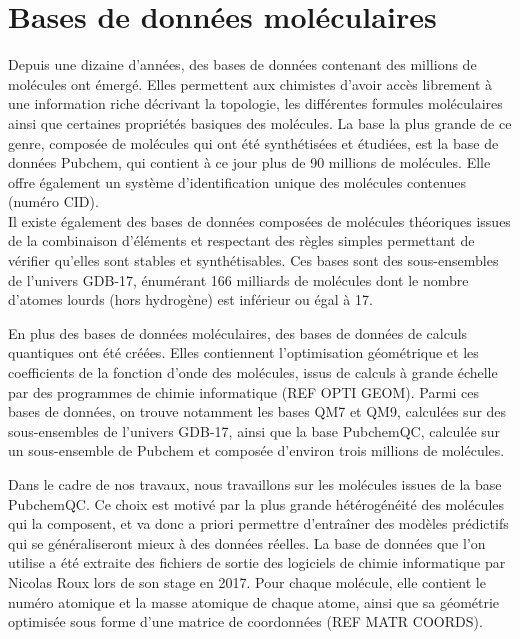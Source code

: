 \section{Bases de données moléculaires}
\par Depuis une dizaine d'années, des bases de données contenant des millions de molécules ont émergé. Elles permettent aux chimistes d'avoir accès librement à une information riche décrivant la topologie, les différentes formules moléculaires ainsi que certaines propriétés basiques des molécules. La base la plus grande de ce genre, composée de molécules qui ont été synthétisées et étudiées, est la base de données Pubchem\cite{pubchem}, qui contient à ce jour plus de 90 millions de molécules. Elle offre également un système d'identification unique des molécules contenues (numéro CID). \\
Il existe également des bases de données composées de molécules théoriques issues de la combinaison d'éléments et respectant des règles simples permettant de vérifier qu'elles sont stables et synthétisables. Ces bases sont des sous-ensembles de l'univers GDB-17\cite{gdb}, énumérant 166 milliards de molécules dont le nombre d'atomes lourds (hors hydrogène) est inférieur ou égal à 17.\\

\par En plus des bases de données moléculaires, des bases de données de calculs quantiques ont été créées. Elles contiennent l'optimisation géométrique et les coefficients de la fonction d'onde des molécules, issus de calculs à grande échelle par des programmes de chimie informatique (REF OPTI GEOM). Parmi ces bases de données, on trouve notamment les bases QM7 et QM9, calculées sur des sous-ensembles de l'univers GDB-17, ainsi que la base PubchemQC\cite{pubchemqc}, calculée sur un sous-ensemble de Pubchem et composée d'environ trois millions de molécules.\\

\par Dans le cadre de nos travaux, nous travaillons sur les molécules issues de la base PubchemQC. Ce choix est motivé par la plus grande hétérogénéité des molécules qui la composent, et va donc a priori permettre d'entraîner des modèles prédictifs qui se généraliseront mieux à des données réelles. La base de données que l'on utilise a été extraite des fichiers de sortie des logiciels de chimie informatique par Nicolas Roux lors de son stage en 2017. Pour chaque molécule, elle contient le numéro atomique et la masse atomique de chaque atome, ainsi que sa géométrie optimisée sous forme d'une matrice de coordonnées (REF MATR COORDS).

